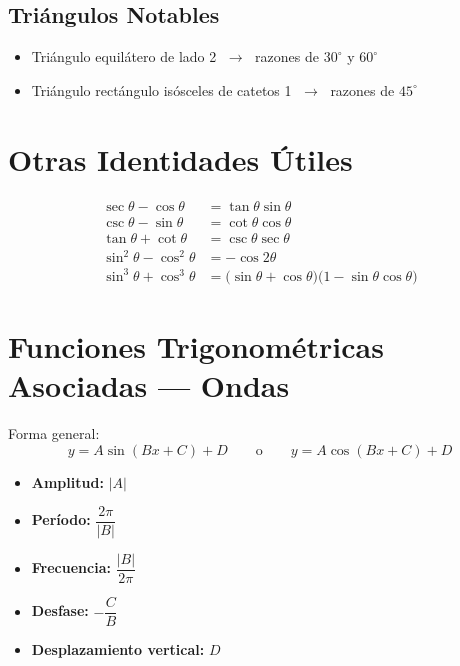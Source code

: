 \documentclass[12pt,a4paper]{article}
\begin{document}
\subsection{Triángulos Notables}
\begin{itemize}[leftmargin=*, itemsep=2pt]
  \item Triángulo equilátero de lado 2
        $\;\longrightarrow\;$ razones de $30^\circ$ y $60^\circ$
  \item Triángulo rectángulo isósceles de catetos 1
        $\;\longrightarrow\;$ razones de $45^\circ$
\end{itemize}

\newpage

\section{Otras Identidades Útiles}

\begin{tcolorbox}[formulabox, title={Demostraciones frecuentes}]
\begin{align*}
\sec\theta  - \cos\theta  &= \tan\theta\sin\theta \\[4pt]
\csc\theta  - \sin\theta  &= \cot\theta\cos\theta \\[4pt]
\tan\theta  + \cot\theta  &= \csc\theta\sec\theta \\[4pt]
\sin^2\theta - \cos^2\theta &= -\cos 2\theta \\[4pt]
\sin^3\theta + \cos^3\theta
  &= \bigl(\sin\theta+\cos\theta\bigr)
     \bigl(1-\sin\theta\cos\theta\bigr)
\end{align*}
\end{tcolorbox}

\section{Funciones Trigonométricas Asociadas --- Ondas}

Forma general:
\[
  y = A\sin(Bx+C)+D \qquad\text{o}\qquad y = A\cos(Bx+C)+D
\]

\begin{tcolorbox}[formulabox]
\begin{itemize}[leftmargin=*, itemsep=4pt]
  \item \textbf{Amplitud:} $|A|$
  \item \textbf{Período:} $\dfrac{2\pi}{|B|}$
  \item \textbf{Frecuencia:} $\dfrac{|B|}{2\pi}$
  \item \textbf{Desfase:} $-\dfrac{C}{B}$
  \item \textbf{Desplazamiento vertical:} $D$
\end{itemize}
\end{tcolorbox}
\end{document}
